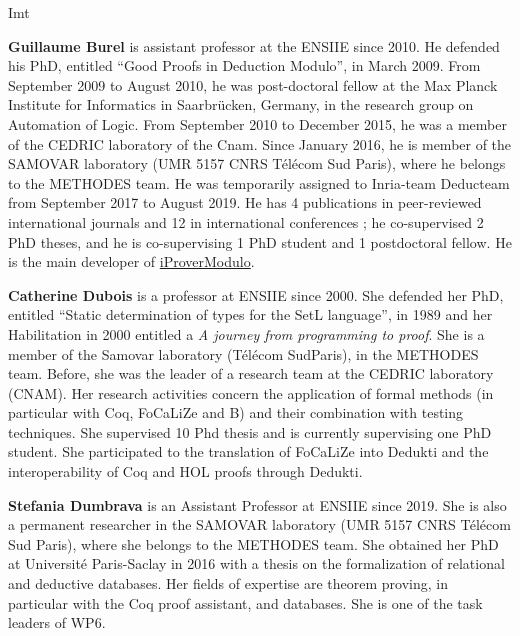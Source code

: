 \begin{sitedescription}{Imt}
\begin{compactitem}
\item{\bf Guillaume Burel}
 is
assistant professor at the ENSIIE since 2010. He defended his PhD,
entitled ``Good Proofs in Deduction Modulo'', in March 2009. From
September 2009 to August 2010, he was post-doctoral fellow at the Max
Planck Institute for Informatics in Saarbr\"ucken, Germany, in the
research group on Automation of Logic. From September 2010 to December
2015, he was a member of the CEDRIC laboratory of the Cnam. Since
January 2016, he is member of the SAMOVAR laboratory (UMR 5157 CNRS
T\'el\'ecom Sud Paris), where he belongs to the METHODES team. He was
temporarily assigned to Inria-team Deducteam from September 2017 to
August 2019.  He has 4
publications in peer-reviewed international journals and 12 in
international conferences ; he co-supervised 2 PhD theses, and he is
co-supervising 1 PhD student and 1 postdoctoral fellow. He is the
main developer of
\href{http://www.ensiie.fr/~guillaume.burel/blackandwhite_iProverModulo.html.en}{iProverModulo}.

\item {\bf Catherine Dubois} is a professor at ENSIIE since 2000. She defended her PhD, entitled ``Static determination of types for the SetL language'', in 1989 and her Habilitation in 2000 entitled a
\emph{A journey from programming to proof}. She is a 
member of the Samovar laboratory (T\'el\'ecom
SudParis), in the METHODES team. Before, she was the leader of a research team at the CEDRIC laboratory (CNAM). Her research activities concern the application of formal methods (in particular with Coq, FoCaLiZe and B) and their combination with testing techniques. She supervised 10 Phd thesis and is currently supervising one PhD student. She participated to the translation of FoCaLiZe into Dedukti and the interoperability of Coq and HOL proofs through Dedukti.

\item{\bf Stefania Dumbrava}
is an Assistant Professor at ENSIIE since 2019. She is also a permanent researcher in the SAMOVAR laboratory (UMR 5157 CNRS T\'el\'ecom
Sud Paris), where she belongs to the METHODES team. She obtained her PhD at Universit\'e Paris-Saclay in 2016 with a thesis on the formalization 
of relational and deductive databases. Her fields of expertise are theorem proving, in particular with the Coq proof assistant, and databases. 
She is one of the task leaders of WP6. 
\end{compactitem}


\end{sitedescription}

